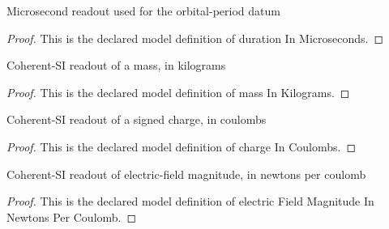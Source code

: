 \begin{definition}
  \label{def:physics:phyx-mini-0912:phyxminiproblems-problemphyxmini0912-durationinmicroseconds}
  Microsecond readout used for the orbital-period datum
\end{definition}
\begin{proof}
  This is the declared model definition of duration In Microseconds.
\end{proof}
\begin{definition}
  \label{def:physics:phyx-mini-0912:phyxminiproblems-problemphyxmini0912-massinkilograms}
  Coherent-SI readout of a mass, in kilograms
\end{definition}
\begin{proof}
  This is the declared model definition of mass In Kilograms.
\end{proof}
\begin{definition}
  \label{def:physics:phyx-mini-0912:phyxminiproblems-problemphyxmini0912-chargeincoulombs}
  Coherent-SI readout of a signed charge, in coulombs
\end{definition}
\begin{proof}
  This is the declared model definition of charge In Coulombs.
\end{proof}
\begin{definition}
  \label{def:physics:phyx-mini-0912:phyxminiproblems-problemphyxmini0912-electricfieldmagnitudeinnewtonspercoulomb}
  Coherent-SI readout of electric-field magnitude, in newtons per coulomb
\end{definition}
\begin{proof}
  This is the declared model definition of electric Field Magnitude In Newtons Per Coulomb.
\end{proof}
